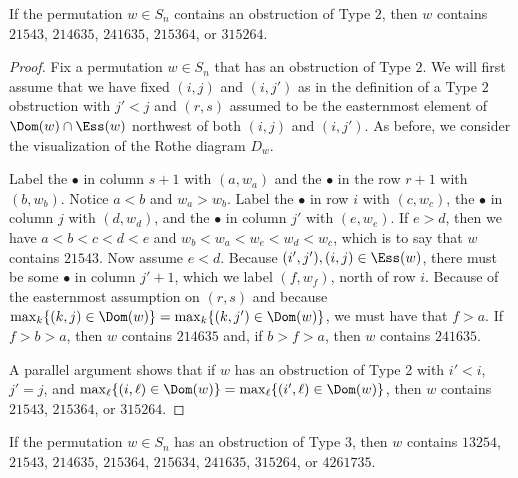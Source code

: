 \begin{lemma}\label{lem:obstruction2}
If the permutation $w \in S_n$ contains an obstruction of Type $2$, then $w$ contains $21543$, $214635$, $241635$, $215364$, or $315264$.
\end{lemma}
\begin{proof}
Fix a permutation $w \in S_n$ that has an obstruction of Type $2$.  We will first assume that we have fixed $(i,j)$ and $(i,j')$ as in the definition of a Type $2$ obstruction with $j'<j$ and $(r,s)$ assumed to be the easternmost element of $\Dom(w) \cap \Ess(w)$ northwest of both $(i,j)$ and $(i,j')$.  As before, we consider the visualization of the Rothe diagram $D_w$.

Label the $\bullet$ in column $s+1$ with $(a,w_a)$ and the $\bullet$ in the row $r+1$ with $(b,w_b)$.  Notice $a<b$ and $w_a>w_b$.  Label the $\bullet$ in row $i$ with $(c,w_c)$, the $\bullet$ in column $j$ with $(d,w_d)$, and the $\bullet$ in column $j'$ with $(e,w_e)$.  If $e>d$, then we have $a<b<c<d<e$ and $w_b<w_a<w_e<w_d<w_c$, which is to say that $w$ contains $21543$.  Now assume $e<d$.  Because $(i',j'), (i,j) \in \Ess(w)$, there must be some $\bullet$ in column $j'+1$, which we label $(f,w_f)$, north of row $i$.  Because of the easternmost assumption on $(r,s)$ and because $\max_k \{(k,j) \in \Dom(w)\} = \max_k \{(k,j') \in \Dom(w)\}$, we must have that $f>a$.  If $f>b>a$, then $w$ contains $214635$ and, if $b>f>a$, then $w$ contains $241635$.  

A parallel argument shows that if $w$ has an obstruction of Type 2 with $i'<i$, $j' = j$, and $\max_\ell \{(i,\ell) \in \Dom(w)\} = \max_\ell \{(i',\ell) \in \Dom(w)\}$, then $w$ contains $21543$, $215364$, or $315264$.
\end{proof}

\begin{lemma}\label{lem:obstruction3}
If the permutation $w \in S_n$ has an obstruction of Type $3$, then $w$ contains $13254$, $21543$, $214635$, $215364$, $215634$, $241635$, $315264$, or $4261735$.  
\end{lemma}

